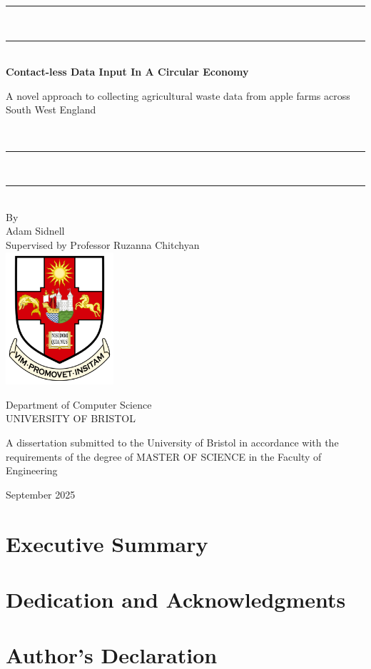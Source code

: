 \documentclass{article}
\begin{document}
\begin{titlepage}
    \centering
    
    \rule{\textwidth}{2pt} \\[-0.4ex] 
    \rule{\textwidth}{0.5pt} \\[1cm] 
    
    {\LARGE\bfseries Contact-less Data Input In A Circular Economy} \\[0.5cm]
    
    \parbox{0.89\textwidth}{\centering
    {\large A novel approach to collecting agricultural waste data from apple farms across South West England}
    } \\[0.5cm]
    
    \rule{\textwidth}{0.5pt} \\[-0.4ex] 
    \rule{\textwidth}{2pt} \\[1cm]   
    
    {\large By} \\[0.5cm]
    {\large Adam Sidnell} \\[1cm]
    {\large Supervised by Professor Ruzanna Chitchyan} \\[1.5cm]
    
    \includegraphics[width=0.3\textwidth]{uob_logo.png} \\[1.5cm]
    
    \begin{minipage}{0.6\textwidth} %
        \centering
        {\Large Department of Computer Science} \\[0.5cm]
        {\Large UNIVERSITY OF BRISTOL} \\[1cm]
        \begin{flushleft}
        {\normalsize A dissertation submitted to the University of Bristol in accordance with the requirements of the degree of MASTER OF SCIENCE in the Faculty of Engineering} \\[1cm]
        \end{flushleft}
        {\large September 2025}
    \end{minipage}

    
    \vfill

\end{titlepage}

\section{Executive Summary}
\section{Dedication and Acknowledgments}
\section{Author's Declaration}
\
\end{document}
